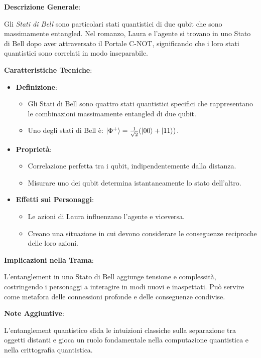\begin{tcolorbox}[colback=white,colframe=black,title=\textbf{Stato di Bell}]
\begin{multicols}{2}
\textbf{Descrizione Generale}:

Gli \emph{Stati di Bell} sono particolari stati quantistici di due qubit che sono massimamente entangled. Nel romanzo, Laura e l'agente si trovano in uno Stato di Bell dopo aver attraversato il Portale C-NOT, significando che i loro stati quantistici sono correlati in modo inseparabile.

\textbf{Caratteristiche Tecniche}:

\begin{itemize}
    \item \textbf{Definizione}:
    \begin{itemize}
        \item Gli Stati di Bell sono quattro stati quantistici specifici che rappresentano le combinazioni massimamente entangled di due qubit.
        \item Uno degli stati di Bell è: $\ket{\Phi^+} = \frac{1}{\sqrt{2}} (\ket{00} + \ket{11})$.
    \end{itemize}
    \item \textbf{Proprietà}:
    \begin{itemize}
        \item Correlazione perfetta tra i qubit, indipendentemente dalla distanza.
        \item Misurare uno dei qubit determina istantaneamente lo stato dell'altro.
    \end{itemize}
    \item \textbf{Effetti sui Personaggi}:
    \begin{itemize}
        \item Le azioni di Laura influenzano l'agente e viceversa.
        \item Creano una situazione in cui devono considerare le conseguenze reciproche delle loro azioni.
    \end{itemize}
\end{itemize}

\textbf{Implicazioni nella Trama}:

L'entanglement in uno Stato di Bell aggiunge tensione e complessità, costringendo i personaggi a interagire in modi nuovi e inaspettati. Può servire come metafora delle connessioni profonde e delle conseguenze condivise.

\textbf{Note Aggiuntive}:

L'entanglement quantistico sfida le intuizioni classiche sulla separazione tra oggetti distanti e gioca un ruolo fondamentale nella computazione quantistica e nella crittografia quantistica.

\end{multicols}
\end{tcolorbox}

